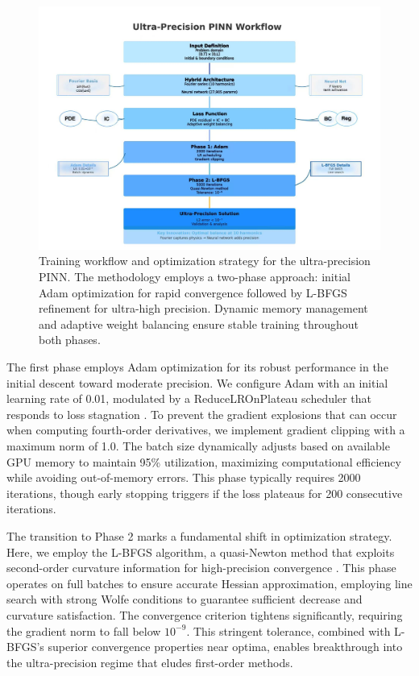\begin{figure}[ht]
    \centering
    \includegraphics[width=\linewidth]{figures/workflow_diagram.png}
    \caption{Training workflow and optimization strategy for the ultra-precision PINN. The methodology employs a two-phase approach: initial Adam optimization for rapid convergence followed by L-BFGS refinement for ultra-high precision. Dynamic memory management and adaptive weight balancing ensure stable training throughout both phases.}
    \label{fig:workflow}
\end{figure}

The first phase employs Adam optimization for its robust performance in the initial descent toward moderate precision. We configure Adam with an initial learning rate of 0.01, modulated by a ReduceLROnPlateau scheduler that responds to loss stagnation \cite{kingma2014adam}. To prevent the gradient explosions that can occur when computing fourth-order derivatives, we implement gradient clipping with a maximum norm of 1.0. The batch size dynamically adjusts based on available GPU memory to maintain 95\% utilization, maximizing computational efficiency while avoiding out-of-memory errors. This phase typically requires 2000 iterations, though early stopping triggers if the loss plateaus for 200 consecutive iterations.

The transition to Phase 2 marks a fundamental shift in optimization strategy. Here, we employ the L-BFGS algorithm, a quasi-Newton method that exploits second-order curvature information for high-precision convergence \cite{liu1989limited}. This phase operates on full batches to ensure accurate Hessian approximation, employing line search with strong Wolfe conditions to guarantee sufficient decrease and curvature satisfaction. The convergence criterion tightens significantly, requiring the gradient norm to fall below $10^{-9}$. This stringent tolerance, combined with L-BFGS's superior convergence properties near optima, enables breakthrough into the ultra-precision regime that eludes first-order methods.

